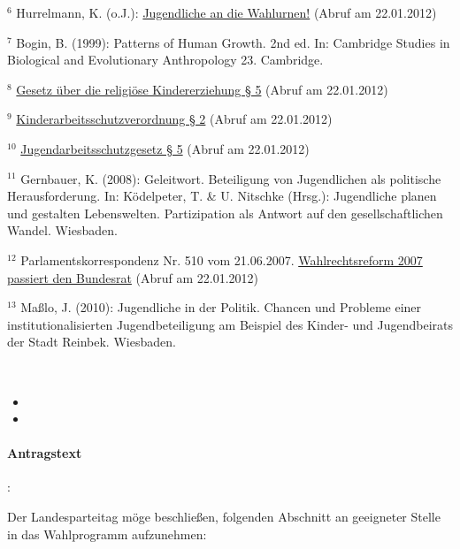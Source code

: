 {$^6$ Hurrelmann, K. (o.J.): \href{http://gedankensex.de/2011/08/23/jugendliche-an-die-wahlurnen/}{Jugendliche an die Wahlurnen!} (Abruf am 22.01.2012)

$^7$ Bogin, B. (1999): Patterns of Human Growth. 2nd ed. In: Cambridge Studies in Biological and Evolutionary Anthropology 23. Cambridge.

$^8$ \href{http://www.gesetze-im-internet.de/kerzg/__5.html}{Gesetz über die religiöse Kindererziehung § 5} (Abruf am 22.01.2012)

$^9$ \href{http://www.gesetze-im-internet.de/kindarbschv/__2.html}{Kinderarbeitsschutzverordnung § 2} (Abruf am 22.01.2012)

$^{10}$ \href{http://bundesrecht.juris.de/jarbschg/__5.html}{Jugendarbeitsschutzgesetz § 5} (Abruf am 22.01.2012)

$^{11}$ Gernbauer, K. (2008): Geleitwort. Beteiligung von Jugendlichen als politische Herausforderung. In: Ködelpeter, T. \& U. Nitschke (Hrsg.): Jugendliche planen und gestalten Lebenswelten. Partizipation als Antwort auf den gesellschaftlichen Wandel. Wiesbaden.

$^{12}$ Parlamentskorrespondenz Nr. 510 vom 21.06.2007. \href{http://www.parlinkom.gv.at/PAKT/PR/JAHR_2007/PK0510/index.shtml}{Wahlrechtsreform 2007 passiert den Bundesrat} (Abruf am 22.01.2012)

$^{13}$ Maßlo, J. (2010): Jugendliche in der Politik. Chancen und Probleme einer institutionalisierten Jugendbeteiligung am Beispiel des Kinder- und Jugendbeirats der Stadt Reinbek. Wiesbaden.
}


\label{wpa:feiertg1}
\\
\begin{itemize}
\item {}
\item {}
\end{itemize}

\paragraph{Antragstext}:

Der Landesparteitag möge beschließen, folgenden Abschnitt an geeigneter Stelle in das Wahlprogramm aufzunehmen:


